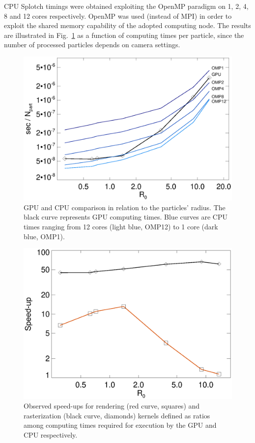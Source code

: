 \documentclass[smallextended]{svjour3}
\begin{document}
CPU Splotch timings were obtained exploiting the OpenMP paradigm on 1, 2, 4, 8 and 12 cores respectively. OpenMP was used (instead of MPI) in order to exploit the shared memory capability of the adopted computing node. The results are illustrated in Fig.~\ref{fig:gpucpu} as a function of computing times per particle, since the number of processed particles depends on camera settings.

\begin{figure}
\includegraphics[scale=0.5]{scalaomp.eps}
\caption{GPU and CPU comparison in relation to the particles' radius. The black curve represents GPU computing times. Blue curves are CPU times ranging from 12 cores (light blue, OMP12) to 1 core (dark blue, OMP1).}
\label{fig:gpucpu}
\end{figure}

\begin{figure}
\includegraphics[scale=0.5]{speedup.eps}
\caption{
Observed speed-ups for rendering (red curve, squares) and rasterization (black curve, diamonds) kernels defined as ratios among computing times required for execution by the GPU and CPU respectively.
}
\label{fig:speedup}
\end{figure}
\end{document}
